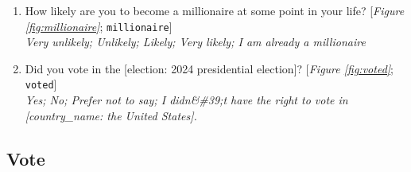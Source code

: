 \begin{enumerate}[resume]
\item  \label{q:millionaire} How likely are you to become a millionaire at some point in your life? [\textit{Figure \ref{fig:millionaire}}; 
\verb|millionaire|]
  \\ \textit{Very unlikely; Unlikely; Likely; Very likely; I am already a millionaire}

\item  \label{q:voted} Did you vote in the [election: 2024 presidential election]? [\textit{Figure \ref{fig:voted}}; 
\verb|voted|]
  \\ \textit{Yes; No; Prefer not to say; I didn\&\#39;t have the right to vote in [country\_name: the United States].}

\end{enumerate} 

 \subsection*{Vote} 
